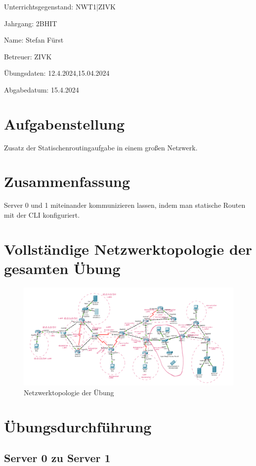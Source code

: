 \documentclass[a4paper]{article}
\begin{document}
\vspace*{\fill}
Unterrichtsgegenstand:	NWT1|ZIVK

Jahrgang:	2BHIT

Name:	Stefan Fürst

Betreuer: 	ZIVK

Übungsdaten:	12.4.2024,15.04.2024

Abgabedatum:	15.4.2024


\newpage
\tableofcontents

\newpage

\section{Aufgabenstellung}
Zusatz der Statischenroutingaufgabe in einem großen Netzwerk.
\section{Zusammenfassung}
Server 0 und 1 miteinander kommunizieren lassen, indem man statische Routen mit der CLI konfiguriert.


\newpage

\section{Vollständige Netzwerktopologie der gesamten Übung}

\begin{figure}[h]
	\includegraphics[scale=0.5]{topologie.png}
	\caption{Netzwerktopologie der Übung}
\end{figure}

\newpage

\section{Übungsdurchführung}
\subsection{Server 0 zu Server 1}
\end{document}
